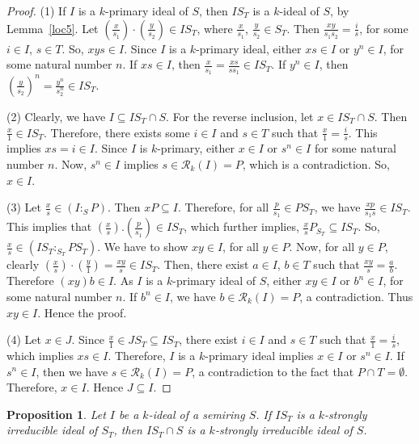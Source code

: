 \documentclass[11pt,english]{amsart}
\newtheorem{proposition}[theorem]{Proposition}
\theoremstyle{definition}
\numberwithin{equation}{section}
\begin{document}
\begin{proof}
(1) If $I$ is a $k$-primary ideal of $S$, then $IS_T$ is a $k$-ideal of $S$, by Lemma~\ref{loc5}. Let $(\frac{x}{s_1})\cdot(\frac{y}{s_2})\in IS_T$, where $\frac{x}{s_1}$, $\frac{y}{s_2}\in S_T$. Then $\frac{xy}{s_1s_2}=\frac{i}{s}$, for some $i\in I$, $s\in T$. So, $xys\in I$. Since $I$ is a $k$-primary ideal, either $xs\in I$ or $y^n\in I$, for some natural number $n$. If $xs\in I$, then $\frac{x}{s_1}=\frac{xs}{ss_1}\in IS_T$. If $y^n\in I$, then $(\frac{y}{s_2})^n=\frac{y^n}{s_2^n}\in IS_T$.
    
(2) Clearly, we have $I\subseteq IS_T\cap S$. For the reverse inclusion, let $x\in IS_T\cap S$. Then $\frac{x}{1}\in IS_T$. Therefore, there exists some $i\in I$ and $s\in T$ such that $\frac{x}{1}=\frac{i}{s}$. This implies $xs=i\in I$. Since $I$ is $k$-primary, either $x\in I$ or $s^n\in I$ for some natural number $n$. Now, $s^n\in I$ implies $s\in \mathcal{R}_k(I)=P$, which is a contradiction. So, $x\in I$.
    
(3) Let $\frac{x}{s}\in (I:_SP)$. Then $xP\subseteq I$. Therefore, for all $\frac{p}{s_1}\in PS_T$, we have $\frac{xp}{s_1s}\in IS_T$. This implies that $(\frac{x}{s}).(\frac{p}{s_1})\in IS_T$, which further implies, $\frac{x}{s}P_{S_T}\subseteq IS_T$. So, $\frac{x}{s}\in (IS_T:_{S_T} PS_T)$. We have to show $xy\in I$, for all $y\in P$. Now, for all $y\in P$, clearly $(\frac{x}{s})\cdot(\frac{y}{1})=\frac{xy}{s} \in IS_T$. Then, there exist $a\in I$, $b\in T$ such that $\frac{xy}{s}=\frac{a}{b}$. Therefore $(xy)b\in I$. As $I$ is a $k$-primary ideal of $S$, either $xy\in I$ or $b^n\in I$, for some natural number $n$. If $b^n\in I$, we have $b\in \mathcal{R}_k(I)=P$, a contradiction. Thus $xy\in I$. Hence the proof.
    
(4) Let $x\in J$. Since $\frac{x}{1}\in JS_T\subseteq IS_T$, there exist $i\in I$ and $s\in T$ such that $\frac{x}{1}=\frac{i}{s}$, which implies $xs\in I$. Therefore, $I$ is a $k$-primary ideal implies $x\in I$ or $s^n\in I$. If $s^n\in I$, then we have $s\in \mathcal{R}_k(I)=P$, a contradiction to the fact that $P\cap T=\emptyset$. Therefore, $x\in I$. Hence $J\subseteq I$.
\end{proof}

\begin{proposition}\label{loc7}
Let $I$ be a $k$-ideal of a semiring $S$. If $IS_T$ is a $k$-strongly irreducible
ideal of $S_T$, then $IS_T\cap S$ is a $k$-strongly irreducible ideal of $S$.
\end{proposition}
\end{document}
